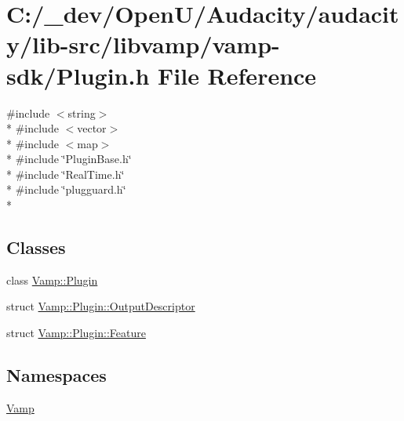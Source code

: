 \hypertarget{libvamp_2vamp-sdk_2plugin_8h}{}\section{C\+:/\+\_\+dev/\+Open\+U/\+Audacity/audacity/lib-\/src/libvamp/vamp-\/sdk/\+Plugin.h File Reference}
\label{libvamp_2vamp-sdk_2plugin_8h}
{\ttfamily \#include $<$string$>$}\\*
{\ttfamily \#include $<$vector$>$}\\*
{\ttfamily \#include $<$map$>$}\\*
{\ttfamily \#include \char`\"{}Plugin\+Base.\+h\char`\"{}}\\*
{\ttfamily \#include \char`\"{}Real\+Time.\+h\char`\"{}}\\*
{\ttfamily \#include \char`\"{}plugguard.\+h\char`\"{}}\\*
\subsection*{Classes}
\begin{DoxyCompactItemize}
\item 
class \hyperlink{class_vamp_1_1_plugin}{Vamp\+::\+Plugin}
\item 
struct \hyperlink{struct_vamp_1_1_plugin_1_1_output_descriptor}{Vamp\+::\+Plugin\+::\+Output\+Descriptor}
\item 
struct \hyperlink{struct_vamp_1_1_plugin_1_1_feature}{Vamp\+::\+Plugin\+::\+Feature}
\end{DoxyCompactItemize}
\subsection*{Namespaces}
\begin{DoxyCompactItemize}
\item 
 \hyperlink{namespace_vamp}{Vamp}
\end{DoxyCompactItemize}
